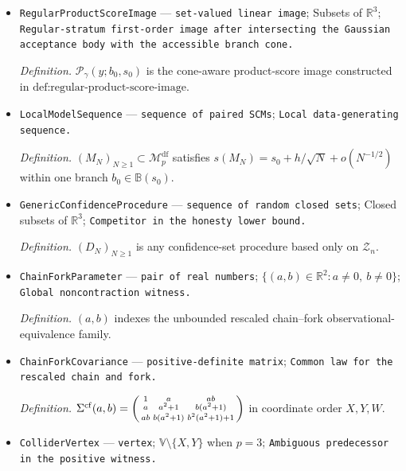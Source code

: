 \documentclass{article}
\begin{document}
\begin{itemize}
  \par\smallskip\noindent\emph{Definition.} \(\mathcal K^{(1)}_h=\bigcup_{b\in\mathbb B(s_0)}\{D\theta_b(s_0)u:u\in T_b(s_0)\cap\mathcal A_{\gamma}(h+\mathbb Z_0)\}\).
  \item \texttt{RegularProductScoreImage} --- \texttt{set-\allowbreak{}valued linear image}; Subsets of \(\mathbb R^3\); \texttt{Regular-\allowbreak{}stratum first-\allowbreak{}order image after intersecting the Gaussian acceptance body with the accessible branch cone.}
  \par\smallskip\noindent\emph{Definition.} \(\mathcal P_{\gamma}(y;b_0,s_0)\) is the cone-aware product-score image constructed in \(\text{def:regular-product-score-image}\).
  \item \texttt{LocalModelSequence} --- \texttt{sequence of paired SCMs}; \texttt{Local data-\allowbreak{}generating sequence.}
  \par\smallskip\noindent\emph{Definition.} \((M_N)_{N\ge1}\subset\mathcal M_p^{\mathrm{df}}\) satisfies \(s(M_N)=s_0+h/\sqrt N+o(N^{-1/2})\) within one branch \(b_0\in\mathbb B(s_0)\).
  \item \texttt{GenericConfidenceProcedure} --- \texttt{sequence of random closed sets}; Closed subsets of \(\mathbb R^3\); \texttt{Competitor in the honesty lower bound.}
  \par\smallskip\noindent\emph{Definition.} \((D_N)_{N\ge1}\) is any confidence-set procedure based only on \(\mathcal Z_n\).
  \item \texttt{ChainForkParameter} --- \texttt{pair of real numbers}; \(\{(a,b)\in\mathbb R^2:a\neq0,\ b\neq0\}\); \texttt{Global noncontraction witness.}
  \par\smallskip\noindent\emph{Definition.} \((a,b)\) indexes the unbounded rescaled chain--fork observational-equivalence family.
  \item \texttt{ChainForkCovariance} --- \texttt{positive-\allowbreak{}definite matrix}; \texttt{Common law for the rescaled chain and fork.}
  \par\smallskip\noindent\emph{Definition.} \(\Sigma^{\mathrm{cf}}(a,b)=\begin{psmallmatrix}1&a&ab\\a&a^2+1&b(a^2+1)\\ab&b(a^2+1)&b^2(a^2+1)+1\end{psmallmatrix}\) in coordinate order \(X,Y,W\).
  \item \texttt{ColliderVertex} --- \texttt{vertex}; \(\mathbb V\setminus\{X,Y\}\) when \(p=3\); \texttt{Ambiguous predecessor in the positive witness.}

\end{itemize}
\end{document}
